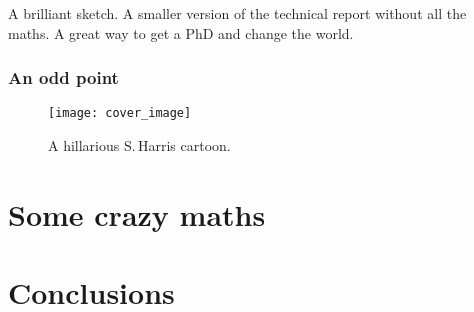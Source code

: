 \documentclass[english,twoside,12pt]{extarticle}
\begin{document}
\begin{infommitemize}
	 A brilliant sketch.
	 A smaller version of the technical report without all the maths.
	 A great way to get a PhD and change the world. 
\end{infommitemize}

\subsubsection*{An odd point}
\begin{figure}[htb]
\centering
\texttt{[image: cover\_image]}
\caption{A hillarious S.\,Harris cartoon.}
\label{fig:harris_cartoon}
\end{figure}

\lipsum[1]

\section*{Some crazy maths}
\blindmathpaper

\section*{Conclusions}


\begin{myquote}
\end{myquote}






\begin{small}
	\nocite{*} %
	
\end{small}
\clearpage
\end{document}
